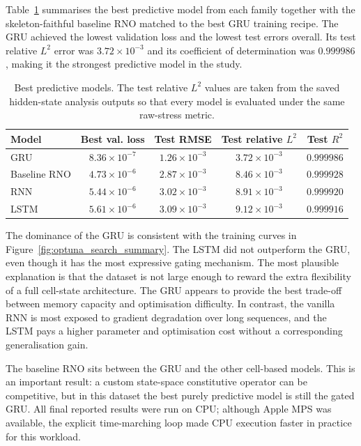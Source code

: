 \documentclass[11pt,a4paper]{article}
\begin{document}
Table~\ref{tab:model_comparison} summarises the best predictive model from each family together with the skeleton-faithful baseline RNO matched to the best GRU training recipe. The GRU achieved the lowest validation loss and the lowest test errors overall. Its test relative $L^2$ error was $3.72\times 10^{-3}$ and its coefficient of determination was $0.999986$, making it the strongest predictive model in the study.

\begin{table}[t]
\centering
\caption{Best predictive models. The test relative $L^2$ values are taken from the saved hidden-state analysis outputs so that every model is evaluated under the same raw-stress metric.}
\label{tab:model_comparison}
\begin{tabular}{lcccc}
\toprule
Model & Best val. loss & Test RMSE & Test relative $L^2$ & Test $R^2$ \\
\midrule
GRU & $8.36\times 10^{-7}$ & $1.26\times 10^{-3}$ & $3.72\times 10^{-3}$ & $0.999986$ \\
Baseline RNO & $4.73\times 10^{-6}$ & $2.87\times 10^{-3}$ & $8.46\times 10^{-3}$ & $0.999928$ \\
RNN & $5.44\times 10^{-6}$ & $3.02\times 10^{-3}$ & $8.91\times 10^{-3}$ & $0.999920$ \\
LSTM & $5.61\times 10^{-6}$ & $3.09\times 10^{-3}$ & $9.12\times 10^{-3}$ & $0.999916$ \\
\bottomrule
\end{tabular}
\end{table}

The dominance of the GRU is consistent with the training curves in Figure~\ref{fig:optuna_search_summary}. The LSTM did not outperform the GRU, even though it has the most expressive gating mechanism. The most plausible explanation is that the dataset is not large enough to reward the extra flexibility of a full cell-state architecture. The GRU appears to provide the best trade-off between memory capacity and optimisation difficulty. In contrast, the vanilla RNN is most exposed to gradient degradation over long sequences, and the LSTM pays a higher parameter and optimisation cost without a corresponding generalisation gain.

The baseline RNO sits between the GRU and the other cell-based models. This is an important result: a custom state-space constitutive operator can be competitive, but in this dataset the best purely predictive model is still the gated GRU. All final reported results were run on CPU; although Apple MPS was available, the explicit time-marching loop made CPU execution faster in practice for this workload.
\end{document}
